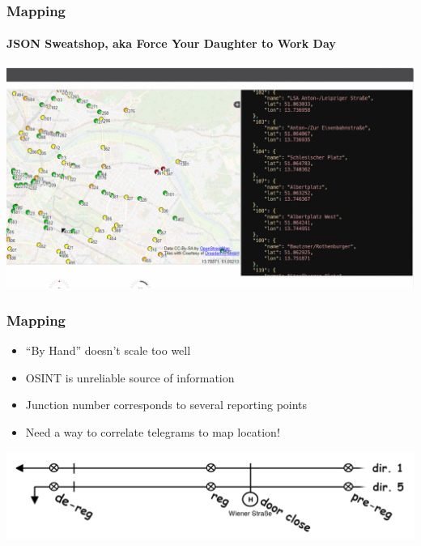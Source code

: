 \begin{frame}
  \frametitle{Mapping}
  \framesubtitle{JSON Sweatshop, aka Force Your Daughter to Work Day}
  \centering
  \includegraphics[width=.8\textwidth]{./figs/urbic-osint-json.png}
\end{frame}

\begin{frame}
  \frametitle{Mapping}
    \begin{itemize}
      \item ``By Hand'' doesn't scale too well
      \item OSINT is unreliable source of information
      \item Junction number corresponds to several reporting points
      \item Need a way to correlate telegrams to map location!
    \end{itemize}
    \vspace{20pt}
    \includegraphics[width=\columnwidth]{./figs/moar_points.png}
\end{frame}

